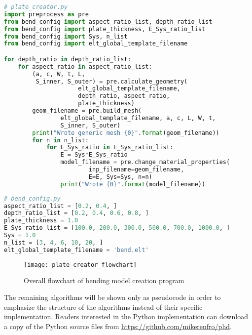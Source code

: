 \begin{Spacing}{1}
\begin{lstlisting}[language=Python,caption={Python implementation of Plate Creator algorithm}, label=lst:plate-creator]
# plate_creator.py
import preprocess as pre
from bend_config import aspect_ratio_list, depth_ratio_list
from bend_config import plate_thickness, E_Sys_ratio_list
from bend_config import Sys, n_list
from bend_config import elt_global_template_filename

for depth_ratio in depth_ratio_list:
    for aspect_ratio in aspect_ratio_list:
        (a, c, W, t, L,
         S_inner, S_outer) = pre.calculate_geometry(
                     elt_global_template_filename,
                     depth_ratio, aspect_ratio,
                     plate_thickness)
        geom_filename = pre.build_mesh(
                elt_global_template_filename, a, c, L, W, t,
                S_inner, S_outer)
        print("Wrote generic mesh {0}".format(geom_filename))
        for n in n_list:
            for E_Sys_ratio in E_Sys_ratio_list:
                E = Sys*E_Sys_ratio
                model_filename = pre.change_material_properties(
                        inp_filename=geom_filename,
                        E=E, Sys=Sys, n=n)
                print("Wrote {0}".format(model_filename))
\end{lstlisting}
\end{Spacing}
\begin{Spacing}{1}
\begin{lstlisting}[language=Python,caption={Python implementation for subset of geometry and material configurations}, label=lst:bend-config]
# bend_config.py
aspect_ratio_list = [0.2, 0.4, ]
depth_ratio_list = [0.2, 0.4, 0.6, 0.8, ]
plate_thickness = 1.0
E_Sys_ratio_list = [100.0, 200.0, 300.0, 500.0, 700.0, 1000.0, ]
Sys = 1.0
n_list = [3, 4, 6, 10, 20, ]
elt_global_template_filename = 'bend.elt'
\end{lstlisting}
\end{Spacing}
\begin{figure}
\centering
\texttt{[image: plate\_creator\_flowchart]}
\caption{\label{fig:plate-creator-flowchart} Overall flowchart of bending model creation program}
\end{figure}


The remaining algorithms will be shown only as pseudocode in order to emphasize the structure of the algorithms instead of their specific implementation.
Readers interested in the Python implementation can download a copy of the Python source files from \url{https://github.com/mikerenfro/phd}.


